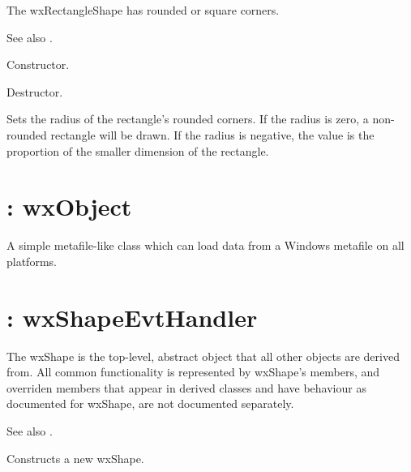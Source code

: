 The wxRectangleShape has rounded or square corners.

See also .



Constructor.



Destructor.



Sets the radius of the rectangle's rounded corners. If the radius is zero, a non-rounded
rectangle will be drawn. If the radius is negative, the value is the proportion of the
smaller dimension of the rectangle.

\section{: wxObject}\label{wxpseudometafile}

A simple metafile-like class which can load data from a Windows metafile on all platforms.


\section{: wxShapeEvtHandler}\label{wxshape}

The wxShape is the top-level, abstract object that all other
objects are derived from. All common functionality is represented by
wxShape's members, and overriden members that appear in derived
classes and have behaviour as documented for wxShape, are not
documented separately.

See also .



Constructs a new wxShape.



